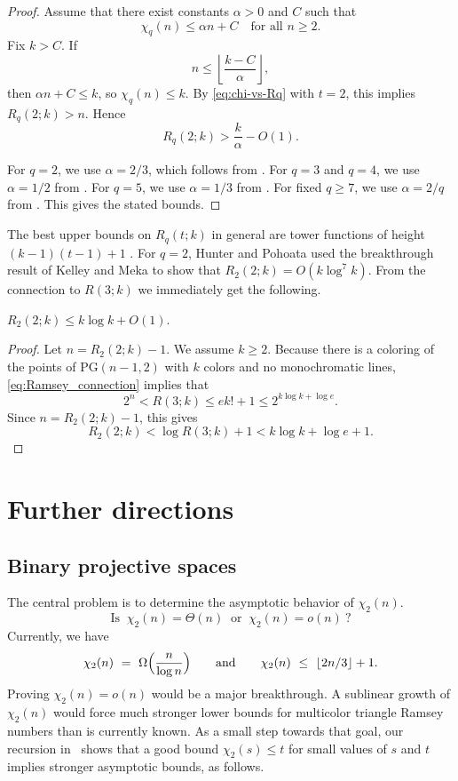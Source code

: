 \documentclass[11pt]{article}
\theoremstyle{plain}
\newcommand{\PG}{\mathrm{PG}}
\newenvironment{reptheorem}[1]{%
  \renewcommand\theinnerthm{\ref*{#1}}%
  \innerthm
}{\endinnerthm}
\begin{document}
\begin{proof}
Assume that there exist constants $\alpha>0$ and $C$ such that
\[
  \chi_q(n)\le \alpha n+C
  \quad\text{for all }n\ge2.
\]
Fix $k>C$.
If
\[
n\le \left\lfloor\frac{k-C}{\alpha}\right\rfloor,
\]
then $\alpha n+C\le k$, so $\chi_q(n)\le k$.
By \eqref{eq:chi-vs-Rq} with $t=2$, this implies $R_q(2;k)>n$.
Hence
\[
R_q(2;k)>\frac{k}{\alpha}-O(1).
\]

For $q=2$, we use $\alpha=2/3$, which follows from . 
For $q=3$ and $q=4$, we use $\alpha=1/2$ from . 
For $q=5$, we use $\alpha=1/3$ from . 
For fixed $q\ge7$, we use $\alpha=2/q$ from . 
This gives the stated bounds.
\end{proof}

The best upper bounds on $R_q(t; k)$ in general are tower functions of height $(k - 1)(t - 1) + 1$ \cite[Theorem 1.3]{Frederickson2023}.
For $q = 2$, Hunter and Pohoata \cite{Hunter2025} used the breakthrough result of Kelley and Meka \cite{KelleyMeka2023} to show that $R_2(2; k) = O(k \log^7 k)$.
From the connection to $R(3; k)$ we immediately get the following.
\begin{reptheorem}{thm:R22k-upper}
$R_2(2;k)\le k\log k + O(1)$.
\end{reptheorem}

\begin{proof}
Let $n = R_2(2; k) - 1$. 
We assume $k \geq 2$.
Because there is a coloring of the points of $\PG(n - 1, 2)$ with $k$ colors and no monochromatic lines, \eqref{eq:Ramsey_connection} implies that 
\[
2^n < R(3; k) \leq e k! + 1 \leq 2^{k \log k + \log e}.
\]
Since $n = R_2(2; k) - 1$, this gives
\[
R_2(2; k) < \log R(3;k) + 1 < k \log k + \log e + 1.
\]

\end{proof}



\section{Further directions}\label{sec:conclusion}
\subsection{Binary projective spaces}\label{sec:open-binary}
The central problem is to determine the asymptotic behavior of $\chi_2(n)$.
\[
\text{Is }\ \chi_2(n)=\Theta(n)\ \text{ or }\ \chi_2(n)=o(n)\ ?
\]
Currently, we have
\[
\chi_2(n)\ =\ \Omega \Bigl(\frac{n}{\log n}\Bigr)
\qquad\text{and}\qquad
\chi_2(n)\ \le\ \lfloor 2n/3 \rfloor + 1.
\]
Proving $\chi_2(n)=o(n)$ would be a major breakthrough. 
A sublinear growth of $\chi_2(n)$ would force much stronger lower bounds for multicolor triangle Ramsey numbers than is currently known.
As a small step towards that goal, our recursion in~ shows that a good bound $\chi_2(s)\le t$ for small values of $s$ and $t$ implies stronger asymptotic bounds, as follows.
\end{document}
